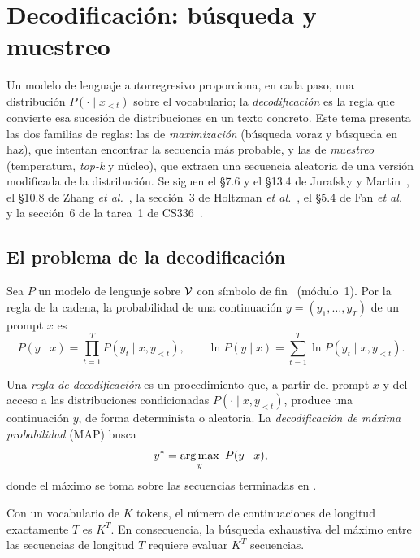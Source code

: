 \chapter{Decodificación: búsqueda y muestreo}
\label{tema:1}

Un modelo de lenguaje autorregresivo proporciona, en cada paso, una distribución $P(\cdot\mid x_{<t})$ sobre el vocabulario; la \emph{decodificación} es la regla que convierte esa sucesión de distribuciones en un texto concreto. Este tema presenta las dos familias de reglas: las de \emph{maximización} (búsqueda voraz y búsqueda en haz), que intentan encontrar la secuencia más probable, y las de \emph{muestreo} (temperatura, \emph{top-k} y núcleo), que extraen una secuencia aleatoria de una versión modificada de la distribución. Se siguen el §7.6 y el §13.4 de Jurafsky y Martin~\cite{jm3}, el §10.8 de Zhang \emph{et al.}~\cite{d2l}, la sección~3 de Holtzman \emph{et al.}~\cite{holtzman}, el §5.4 de Fan \emph{et al.}~\cite{fan} y la sección~6 de la tarea~1 de CS336~\cite{cs336a1}.

\section{El problema de la decodificación}

Sea $P$ un modelo de lenguaje sobre $\mathcal{V}$ con símbolo de fin \fin\ (módulo~1). Por la regla de la cadena, la probabilidad de una continuación $y=(y_1,\dots,y_T)$ de un prompt $x$ es
\[
P(y\mid x)=\prod_{t=1}^{T}P(y_t\mid x,y_{<t}),\qquad
\ln P(y\mid x)=\sum_{t=1}^{T}\ln P(y_t\mid x,y_{<t}).
\]

\begin{definicion}\label{def:decodificacion}
Una \emph{regla de decodificación} es un procedimiento que, a partir del prompt $x$ y del acceso a las distribuciones condicionadas $P(\cdot\mid x,y_{<t})$, produce una continuación $y$, de forma determinista o aleatoria. La \emph{decodificación de máxima probabilidad} (MAP) busca
\[
y^{\ast}=\operatorname*{arg\,max}_{y}\ P(y\mid x),
\]
donde el máximo se toma sobre las secuencias terminadas en \fin.
\end{definicion}

\begin{proposicion}\label{prop:exhaustiva}
Con un vocabulario de $K$ tokens, el número de continuaciones de longitud exactamente $T$ es $K^{T}$. En consecuencia, la búsqueda exhaustiva del máximo entre las secuencias de longitud $T$ requiere evaluar $K^{T}$ secuencias.
\end{proposicion}

